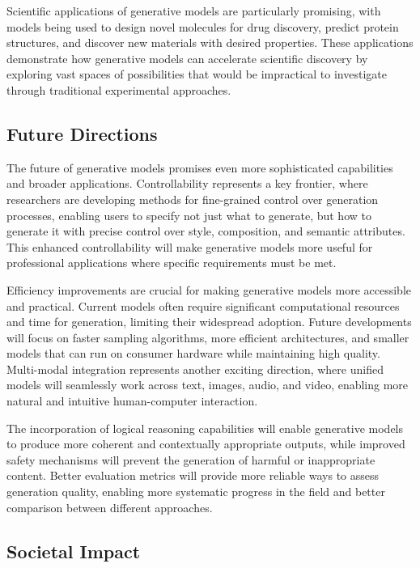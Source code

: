 Scientific applications of generative models are particularly promising, with models being used to design novel molecules for drug discovery, predict protein structures, and discover new materials with desired properties. These applications demonstrate how generative models can accelerate scientific discovery by exploring vast spaces of possibilities that would be impractical to investigate through traditional experimental approaches.

\subsection{Future Directions}

The future of generative models promises even more sophisticated capabilities and broader applications. Controllability represents a key frontier, where researchers are developing methods for fine-grained control over generation processes, enabling users to specify not just what to generate, but how to generate it with precise control over style, composition, and semantic attributes. This enhanced controllability will make generative models more useful for professional applications where specific requirements must be met.

Efficiency improvements are crucial for making generative models more accessible and practical. Current models often require significant computational resources and time for generation, limiting their widespread adoption. Future developments will focus on faster sampling algorithms, more efficient architectures, and smaller models that can run on consumer hardware while maintaining high quality. Multi-modal integration represents another exciting direction, where unified models will seamlessly work across text, images, audio, and video, enabling more natural and intuitive human-computer interaction.

The incorporation of logical reasoning capabilities will enable generative models to produce more coherent and contextually appropriate outputs, while improved safety mechanisms will prevent the generation of harmful or inappropriate content. Better evaluation metrics will provide more reliable ways to assess generation quality, enabling more systematic progress in the field and better comparison between different approaches.

\subsection{Societal Impact}

